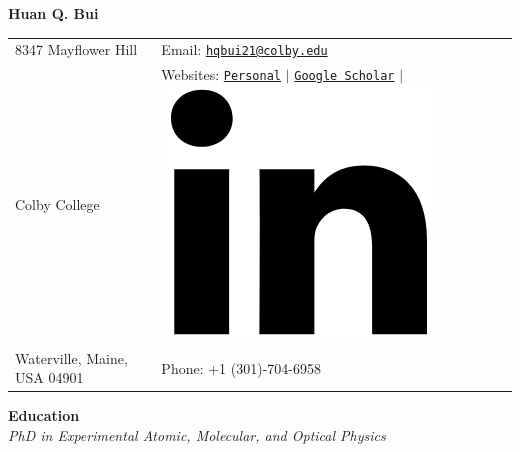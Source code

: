 \documentclass[10pt]{article}
\begin{document}
\noindent  
\begin{center}
{\Huge{\textbf{Huan Q. Bui}}}
\end{center}
\vspace{-10pt}
\hrulefill
\vspace{-1ex}

\normalsize







\begin{center}
\begin{tabular}{l l}
     8347 Mayflower Hill 		 & \hspace{1in} Email: \href{mailto:hqbui21@colby.edu}{\texttt{hqbui21@colby.edu}} \\
     Colby College 				 & \hspace{1in}  Websites: \href{www.huanqbui.com}{\texttt{Personal}} 
     $\vert$ 	\href{https://scholar.google.com/citations?user=ejxM5pkAAAAJ\&hl=en}{\texttt{Google Scholar}} 
     $\vert$ 					\href{https://www.linkedin.com/in/huan-bui/}{\includegraphics[scale=0.04]{linkedin_logo.PNG}} \\
 	Waterville, Maine, USA 04901 & \hspace{1in} Phone: +1 (301)-704-6958\\
\end{tabular}
\end{center}



\noindent\large{\textbf{{Education}}} \normalsize\\
\noindent \textit{PhD in Experimental Atomic, Molecular, and Optical Physics} \\
\end{document}
